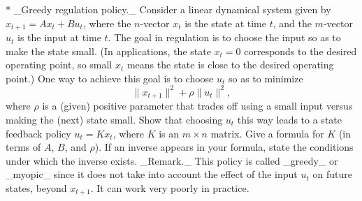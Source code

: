 * _Greedy regulation policy._ Consider a linear dynamical system given by \(x_{t+1}=Ax_{t}+Bu_{t}\), where the \(n\)-vector \(x_{t}\) is the state at time \(t\), and the \(m\)-vector \(u_{t}\) is the input at time \(t\). The goal in regulation is to choose the input so as to make the state small. (In applications, the state \(x_{t}=0\) corresponds to the desired operating point, so small \(x_{t}\) means the state is close to the desired operating point.) One way to achieve this goal is to choose \(u_{t}\) so as to minimize \[\|x_{t+1}\|^{2}+\rho\|u_{t}\|^{2},\] where \(\rho\) is a (given) positive parameter that trades off using a small input versus making the (next) state small. Show that choosing \(u_{t}\) this way leads to a state feedback policy \(u_{t}=Kx_{t}\), where \(K\) is an \(m\times n\) matrix. Give a formula for \(K\) (in terms of \(A\), \(B\), and \(\rho\)). If an inverse appears in your formula, state the conditions under which the inverse exists. _Remark._ This policy is called _greedy_ or _myopic_ since it does not take into account the effect of the input \(u_{t}\) on future states, beyond \(x_{t+1}\). It can work very poorly in practice.

 